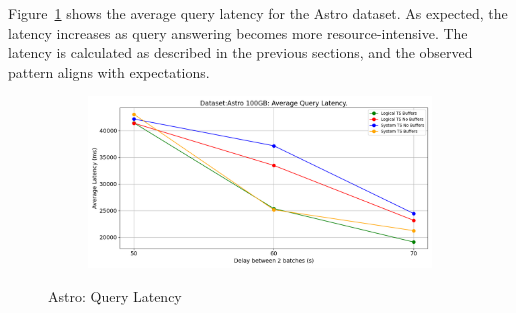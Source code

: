 %
Figure~\ref{fig:query-latency} shows the average query latency for the
Astro dataset. As expected, the latency increases as query answering
becomes more resource-intensive. The latency is calculated as described
in the previous sections, and the observed pattern aligns with expectations.

\begin{figure}
	\centering
	\begin{subfigure}[c]{0.45\textwidth}
		\includegraphics[width=1\textwidth]   {figures/Experiments/Dynamic/ASTRO/average_latency_ASTRO.png}
	\end{subfigure}
	\caption{Astro: Query Latency}
	\label{fig:query-latency}
\end{figure}